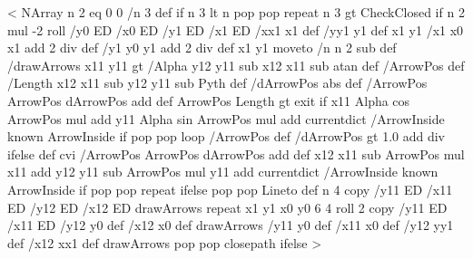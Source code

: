 <{%
    NArray n 2 eq { 0 0 /n 3 def } if
    n 3 lt {
	n { pop pop } repeat
    }{
	n 3 gt { CheckClosed } if
	n 2 mul	-2 roll
	/y0 ED
	/x0 ED
    	/y1 ED
    	/x1 ED
    	/xx1 x1 def
    	/yy1 y1 def
    	x1 y1
    	/x1 x0 x1 add 2 div def
    	/y1 y0 y1 add 2 div def
    	x1 y1 moveto
    	/n n 2 sub def
	/drawArrows {
	    x11 y11
	    \psk@ArrowInsidePos{} gt {
		/Alpha y12 y11 sub x12 x11 sub atan def
		/ArrowPos \psk@ArrowInsideOffset\space def
		/Length x12 x11 sub y12 y11 sub Pyth def
		/dArrowPos \psk@ArrowInsidePos\space abs def
		{
		    /ArrowPos ArrowPos dArrowPos add def
		    ArrowPos Length gt { exit } if
		    x11 Alpha cos ArrowPos mul add
		    y11 Alpha sin ArrowPos mul add
		    currentdict /ArrowInside known { ArrowInside } if
		    pop pop
		} loop
	    }{
		/ArrowPos \psk@ArrowInsideOffset\space def
		/dArrowPos \psk@ArrowInsideNo{} gt {%
	    	    1.0 \psk@ArrowInsideNo{} add div
		}{ \psk@ArrowInsidePos } ifelse def
		\psk@ArrowInsideNo\space cvi {
		    /ArrowPos ArrowPos dArrowPos add def
		    x12 x11 sub ArrowPos mul x11 add
		    y12 y11 sub ArrowPos mul y11 add
		    currentdict /ArrowInside known { ArrowInside } if
		    pop pop
		} repeat
	    } ifelse
	    pop pop Lineto
	} def
	n {
	    4 copy
	    /y11 ED /x11 ED /y12 ED /x12 ED
	    drawArrows
	} repeat
	x1 y1 x0 y0
	6 4 roll
	2 copy
	/y11 ED /x11 ED /y12 y0 def /x12 x0 def
	drawArrows
	/y11 y0 def /x11 x0 def /y12 yy1 def /x12 xx1 def
	drawArrows
	pop pop
    	closepath
    } ifelse %
}>
%
%
